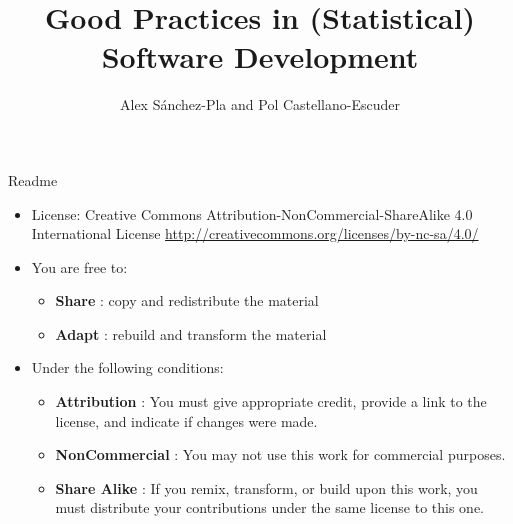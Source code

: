 \documentclass[ignorenonframetext,]{beamer}
\title{Good Practices in (Statistical)\\
Software Development}
\author{Alex Sánchez-Pla and Pol Castellano-Escuder}
\date{Genetics, Microbiology and Statistic Department. UB\\
Statistics and Bioinformatics Unit. VHIR\\
Grup de Recerca en Bioestadí­stica i Bioinformatica (GRBio)\\

\vspace{0.5cm}

\footnotesize{Jan 26, 2019 - BIOSTATNET Meeting}

\vspace{0.2cm}

\footnotesize{\textbf{\url{http://github.com/pcastellanoescuder/Good_Practices_in_Software_Development}}}
}
\providecommand{\tightlist}{%
  \setlength{\itemsep}{0pt}\setlength{\parskip}{0pt}}
\begin{document}
\frame{\titlepage}

\begin{frame}

\begin{block}{Readme}

\begin{itemize}
\item
  License: Creative Commons Attribution-NonCommercial-ShareAlike 4.0
  International License
  \url{http://creativecommons.org/licenses/by-nc-sa/4.0/}
\item
  You are free to:

  \begin{itemize}
  \tightlist
  \item
    \textbf{Share} : copy and redistribute the material
  \item
    \textbf{Adapt} : rebuild and transform the material
  \end{itemize}
\item
  Under the following conditions:

  \begin{itemize}
  \tightlist
  \item
    \textbf{Attribution} : You must give appropriate credit, provide a
    link to the license, and indicate if changes were made.
  \item
    \textbf{NonCommercial} : You may not use this work for commercial
    purposes.
  \item
    \textbf{Share Alike} : If you remix, transform, or build upon this
    work, you must distribute your contributions under the same license
    to this one.
  \end{itemize}
\end{itemize}

\end{block}

\end{frame}
\end{document}
